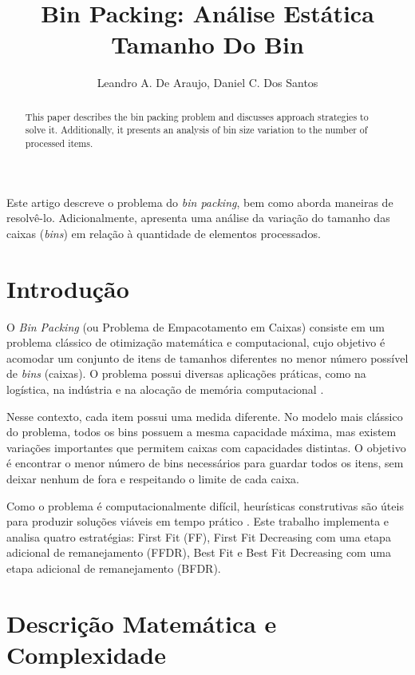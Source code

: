 \documentclass[12pt]{article}
\title{Bin Packing: Análise Estática Tamanho Do Bin}
\author{Leandro A. De Araujo\inst{1}, Daniel C. Dos Santos\inst{1}}
\begin{document}
 

\maketitle

\begin{abstract}
  This paper describes the bin packing problem and discusses approach strategies to solve it. Additionally, it presents an analysis
  of bin size variation  to the number of processed items.
\end{abstract}
     
\begin{resumo} 
  Este artigo descreve o problema do \textit{bin packing}, bem como aborda maneiras de resolvê-lo. Adicionalmente, apresenta uma análise da variação do tamanho das caixas (\textit{bins}) em relação à quantidade de elementos processados.
\end{resumo}


\section{Introdução}

O \textit{Bin Packing} (ou Problema de Empacotamento em Caixas) consiste em um problema clássico de otimização matemática e computacional, cujo objetivo é acomodar um conjunto de itens de tamanhos diferentes no menor número possível de \textit{bins} (caixas). O problema possui diversas aplicações práticas, como na logística, na indústria e na alocação de memória computacional \cite{ambrose2025}.

Nesse contexto, cada item possui uma medida diferente. No modelo mais clássico do problema, todos os bins possuem a mesma capacidade máxima, mas existem variações importantes que permitem caixas com capacidades distintas. O objetivo é encontrar o menor número de bins necessários para guardar todos os itens, sem deixar nenhum de fora e respeitando o limite de cada caixa.

Como o problema é computacionalmente difícil, heurísticas construtivas são úteis para produzir soluções viáveis em tempo prático \cite{ambrose2025}. Este trabalho implementa e analisa quatro estratégias: First Fit (FF), First Fit Decreasing com uma etapa adicional de remanejamento (FFDR), Best Fit e Best Fit Decreasing com uma etapa adicional de remanejamento (BFDR).


\section{Descrição Matemática e Complexidade}
\end{document}
